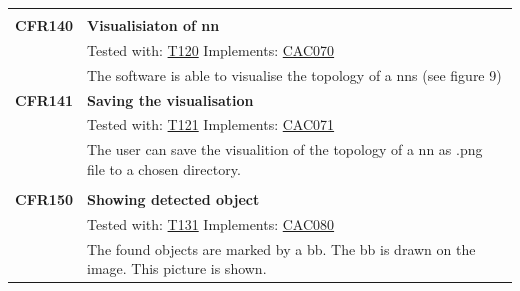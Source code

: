 \documentclass[parskip=full]{scrartcl}
\begin{document}
\begin{tabular}{p{2cm}p{11.4cm}}
& \\
\textbf {CFR140} \hypertarget{CFR120} & \textbf{Visualisiaton of \gls{nn}} \\
& Tested with: \hyperlink{T120}{T120} Implements: \hyperlink{CAC070}{CAC070} \\
& The software is able to visualise the topology of a \glspl{nn} (see figure 9) \\
\textbf{CFR141} \hypertarget{CFR121} & \textbf{Saving the visualisation}\\
& Tested with: \hyperlink{T121}{T121} Implements: \hyperlink{CAC071}{CAC071} \\
& The user can save the visualition of the topology of a \gls{nn} as .png file to a chosen directory.\\
& \\
\textbf {CFR150} \hypertarget{CFR131} & \textbf{Showing detected object} \\
& Tested with: \hyperlink{T131}{T131} Implements: \hyperlink{CAC080}{CAC080}\\
& The found objects are marked by a \gls{bb}. The \gls{bb} is drawn on the image. This picture is shown.\\
\end{tabular}
\newpage
\end{document}
